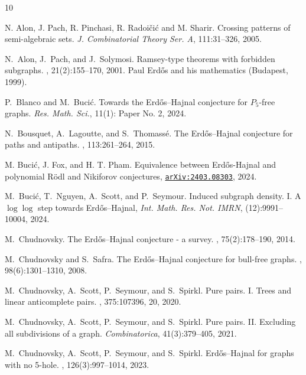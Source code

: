 \documentclass[11pt,reqno,a4paper]{amsart}
\begin{document}
	
	\begin{thebibliography}{10}
		
		
		N. Alon, J. Pach, R. Pinchasi, R. Radoi\v ci\'c and M. Sharir. Crossing patterns of semi-algebraic sets. {\em J. Combinatorial Theory Ser. A}, 111:31--326, 2005.
		
		N.~Alon, J.~Pach, and J.~Solymosi.
		\newblock Ramsey-type theorems with forbidden subgraphs.
		, 21(2):155--170, 2001.
		\newblock Paul Erd\H{o}s and his mathematics (Budapest, 1999).
		
		P.~Blanco and M.~Buci{\'c}.
		\newblock Towards the {Erd{\H o}s--Hajnal} conjecture for $P_5$-free graphs.
		{\em Res. Math. Sci.}, 11(1): Paper No. 2, 2024.
		
		 N.~Bousquet, A.~Lagoutte, and S.~Thomass{\'e}.  \newblock The {E}rd{\H o}s--{H}ajnal conjecture for paths and antipaths.  , 113:261--264, 2015.
		
		 M. Buci\'c, J. Fox, and H. T. Pham.
		Equivalence between Erd\H{o}s-Hajnal and polynomial R\"odl and Nikiforov conjectures,
		\href{https://arxiv.org/abs/2403.08303}{\tt arXiv:2403.08303}, 2024.
		
		M.~Buci{\'c}, T.~Nguyen, A.~Scott, and P.~Seymour.
		\newblock Induced subgraph density. I. A $\log\log$ step towards {Erd{\H
				o}s--Hajnal}, {\em Int. Math. Res. Not. IMRN},
		(12):9991--10004, 2024.
		
		 M.~Chudnovsky.  \newblock The {E}rd{\H o}s--{H}ajnal conjecture - a survey.  , 75(2):178--190, 2014.
		
		M.~Chudnovsky and S.~Safra.
		\newblock The {E}rd{\H o}s--{H}ajnal conjecture for bull-free graphs.
		, 98(6):1301--1310, 2008.
		
		M.~Chudnovsky, A.~Scott, P.~Seymour, and S.~Spirkl.
		\newblock Pure pairs. {I}. {T}rees and linear anticomplete pairs.
		, 375:107396, 20, 2020.
		
		M.~Chudnovsky, A.~Scott, P.~Seymour, and S.~Spirkl.
		Pure pairs. II. Excluding all subdivisions of a graph. {\em Combinatorica}, 41(3):379--405, 2021.
		
		M.~Chudnovsky, A.~Scott, P.~Seymour, and S.~Spirkl.
		\newblock Erd{\H o}s--{H}ajnal for graphs with no 5-hole.
		, 126(3):997--1014, 2023.
		

\end{thebibliography}
\end{document}
